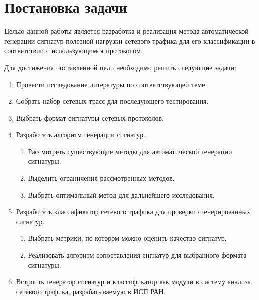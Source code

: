 \section{Постановка задачи}
\label{sec:Section1} 

Целью данной работы является разработка и реализация метода автоматической генерации сигнатур полезной нагрузки сетевого трафика
для его классификации в соответствии с использующимся протоколом.

Для достижения поставленной цели необходимо решить следующие задачи:

\begin{enumerate}
    \item Провести исследование литературы по соответствующей теме.
    \item Собрать набор сетевых трасс для последующего тестирования.
    \item Выбрать формат сигнатуры сетевых протоколов.
    \item Разработать алгоритм генерации сигнатур.
    \begin{enumerate}
        \item Рассмотреть существующие методы для автоматической генерации сигнатуры.
        \item Выделить ограничения рассмотренных методов.
        \item Выбрать оптимальный метод для дальнейшего исследования.
    \end{enumerate}
    \item Разработать классификатор сетевого трафика для проверки сгенерированных сигнатур.
    \begin{enumerate}
        \item Выбрать метрики, по котором можно оценить качество сигнатур.
        \item Реализовать алгоритм сопоставления сигнатур для выбранного формата сигнатуры.
    \end{enumerate}
    \item Встроить генератор сигнатур и классификатор как модули в систему анализа сетевого трафика, разрабатываемую в ИСП РАН.
\end{enumerate}

\newpage
